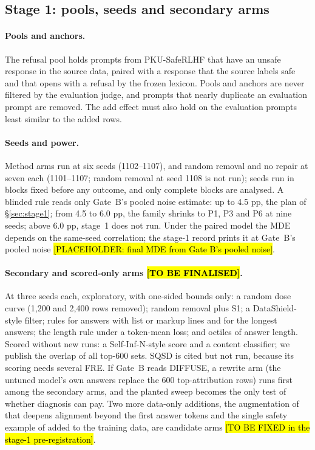\documentclass{article}
\theoremstyle{plain}
\theoremstyle{definition}
\theoremstyle{remark}
\newcommand{\ph}[1]{\hl{#1}}
\begin{document}
\subsection{Stage 1: pools, seeds and secondary arms}
\label{app:stage1}

\paragraph{Pools and anchors.}
The refusal pool holds prompts from PKU-SafeRLHF \citep{ji2025pku} that have an
unsafe response in the source data, paired with a response that the source
labels safe and that opens with a refusal by the frozen lexicon. Pools and
anchors are never filtered by the evaluation judge, and prompts that nearly
duplicate an evaluation prompt are removed. The add effect must also hold on
the evaluation prompts least similar to the added rows.

\paragraph{Seeds and power.}
Method arms run at six seeds (1102--1107), and random removal and no repair at
seven each (1101--1107; random removal at seed 1108 is not run); seeds run in
blocks fixed before any outcome, and only complete blocks are
analysed. A blinded rule reads only Gate~B's pooled noise estimate: up to
4.5 pp, the plan of \S\ref{sec:stage1}; from 4.5 to 6.0 pp, the family shrinks
to P1, P3 and P6 at nine seeds; above 6.0 pp, stage~1 does not run. Under the
paired model the MDE depends on the same-seed correlation; the stage-1 record
prints it at Gate~B's pooled noise \ph{[PLACEHOLDER: final MDE from Gate B's
pooled noise]}.

\paragraph{Secondary and scored-only arms \ph{[TO BE FINALISED]}.}
At three seeds each, exploratory, with one-sided bounds only: a random dose
curve (1,200 and 2,400 rows removed); random removal plus S1; a
DataShield-style filter; rules for answers with list or markup lines and for
the longest answers; the length rule under a token-mean loss; and octiles of
answer length. Scored without new runs: a Self-Inf-N-style score and a content
classifier; we publish the overlap of all top-600 sets. SQSD is cited but not
run, because its scoring needs several FRE. If Gate~B reads DIFFUSE, a
rewrite arm (the untuned model's own answers replace the 600 top-attribution
rows) runs first among the secondary arms, and the planted sweep becomes the
only test of whether diagnosis can pay. Two more data-only additions, the
augmentation of \citet{qi2025shallow} that deepens alignment beyond the first
answer tokens and the single safety example of \citet{zhang2026oneshot} added
to the training data, are candidate arms \ph{[TO BE FIXED in the stage-1 pre-registration]}.
\end{document}
